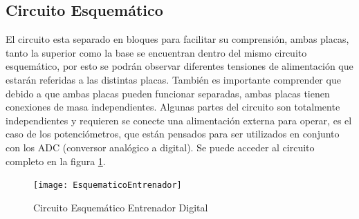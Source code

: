 \subsection{Circuito Esquemático}
El circuito esta separado en bloques para facilitar su comprensión, ambas placas, tanto la superior como la base se encuentran dentro del mismo circuito esquemático, por esto se podrán observar diferentes tensiones de alimentación que estarán referidas a las distintas placas. También es importante comprender que debido a que ambas placas pueden funcionar separadas, ambas placas tienen conexiones de masa independientes. Algunas partes del circuito son totalmente independientes y requieren se conecte una alimentación externa para operar, es el caso de los potenciómetros, que están pensados para ser utilizados en conjunto con los ADC (conversor analógico a digital). Se puede acceder al circuito completo en la figura \ref{CircuitoEntrenador}. %
\begin{figure}[ht]
	\raggedleft\texttt{[image: EsquematicoEntrenador]}
	\caption{Circuito Esquemático Entrenador Digital}
	\label{CircuitoEntrenador}
\end{figure}
